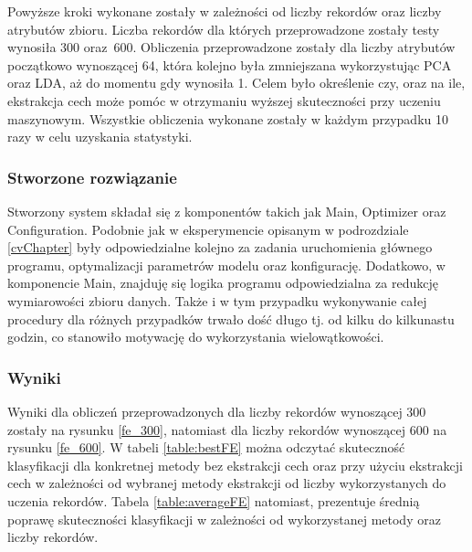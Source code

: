 Powyższe kroki wykonane zostały w zależności od liczby rekordów oraz liczby atrybutów zbioru. Liczba rekordów dla których przeprowadzone zostały testy wynosiła 300 oraz~600. Obliczenia przeprowadzone zostały dla liczby atrybutów początkowo wynoszącej 64, która kolejno była zmniejszana wykorzystując PCA oraz LDA, aż do momentu gdy wynosiła 1. Celem było określenie czy, oraz na ile, ekstrakcja cech może pomóc w otrzymaniu wyższej skuteczności przy uczeniu maszynowym. Wszystkie obliczenia wykonane zostały w każdym przypadku 10 razy w celu uzyskania statystyki.

\subsubsection{Stworzone rozwiązanie}
Stworzony system składał się z komponentów takich jak Main, Optimizer oraz Configuration. Podobnie jak w eksperymencie opisanym w podrozdziale \ref{cvChapter} były odpowiedzialne kolejno za zadania uruchomienia głównego programu, optymalizacji parametrów modelu oraz konfigurację. Dodatkowo, w komponencie Main, znajduję się logika programu odpowiedzialna za redukcję wymiarowości zbioru danych. Także i w tym przypadku wykonywanie całej procedury dla różnych przypadków trwało dość długo tj. od kilku do kilkunastu godzin, co stanowiło motywację do wykorzystania wielowątkowości.

\subsubsection{Wyniki}
Wyniki dla obliczeń przeprowadzonych dla liczby rekordów wynoszącej 300 zostały na rysunku \ref{fe_300}, natomiast dla liczby rekordów wynoszącej 600 na rysunku \ref{fe_600}. W tabeli \ref{table:bestFE} można odczytać skuteczność klasyfikacji dla konkretnej metody bez ekstrakcji cech oraz przy użyciu ekstrakcji cech w zależności od wybranej metody ekstrakcji od liczby wykorzystanych do uczenia rekordów. Tabela \ref{table:averageFE} natomiast, prezentuje średnią poprawę skuteczności klasyfikacji w zależności od wykorzystanej metody oraz liczby rekordów.


